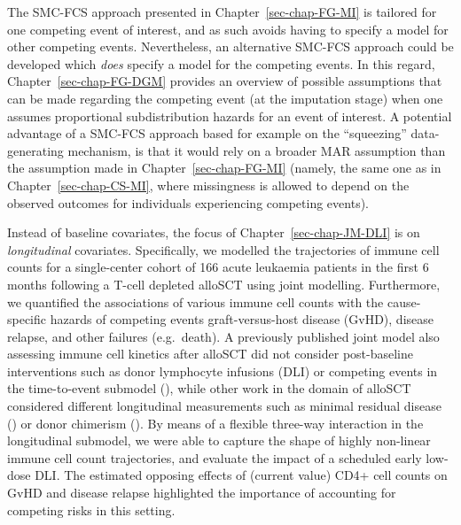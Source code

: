 \documentclass[
  letterpaper,
  DIV=11,
  numbers=noendperiod]{scrreprt}
\begin{document}
The SMC-FCS approach presented in Chapter~\ref{sec-chap-FG-MI} is
tailored for one competing event of interest, and as such avoids having
to specify a model for other competing events. Nevertheless, an
alternative SMC-FCS approach could be developed which \emph{does}
specify a model for the competing events. In this regard,
Chapter~\ref{sec-chap-FG-DGM} provides an overview of possible
assumptions that can be made regarding the competing event (at the
imputation stage) when one assumes proportional subdistribution hazards
for an event of interest. A potential advantage of a SMC-FCS approach
based for example on the ``squeezing'' data-generating mechanism, is
that it would rely on a broader MAR assumption than the assumption made
in Chapter~\ref{sec-chap-FG-MI} (namely, the same one as in
Chapter~\ref{sec-chap-CS-MI}, where missingness is allowed to depend on
the observed outcomes for individuals experiencing competing events).

Instead of baseline covariates, the focus of
Chapter~\ref{sec-chap-JM-DLI} is on \emph{longitudinal} covariates.
Specifically, we modelled the trajectories of immune cell counts for a
single-center cohort of 166 acute leukaemia patients in the first 6
months following a T-cell depleted alloSCT using joint modelling.
Furthermore, we quantified the associations of various immune cell
counts with the cause-specific hazards of competing events
graft-versus-host disease (GvHD), disease relapse, and other failures
(e.g.~death). A previously published joint model also assessing immune
cell kinetics after alloSCT did not consider post-baseline interventions
such as donor lymphocyte infusions (DLI) or competing events in the
time-to-event submodel
(), while other work in the domain of alloSCT
considered different longitudinal measurements such as minimal residual
disease () or donor chimerism
(). By means of a flexible three-way interaction in the
longitudinal submodel, we were able to capture the shape of highly
non-linear immune cell count trajectories, and evaluate the impact of a
scheduled early low-dose DLI. The estimated opposing effects of (current
value) CD4+ cell counts on GvHD and disease relapse highlighted the
importance of accounting for competing risks in this setting.
\end{document}
